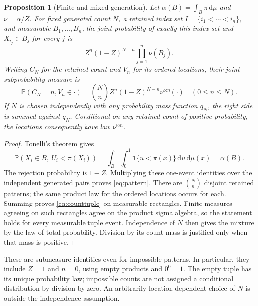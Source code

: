 \documentclass[11pt]{article}
\newtheorem{proposition}[theorem]{Proposition}
\theoremstyle{remark}
\newcommand{\Prb}{\mathbb P}
\newcommand{\dd}{\,\mathrm d}
\newcommand{\ind}{\mathbf 1}
\begin{document}
\begin{proposition}[Finite and mixed generation]\label{prop:finite-thinning}
Let $\alpha(B)=\int_B\pi\dd\mu$ and $\nu=\alpha/Z$. For fixed generated
count $N$, a retained index set $I=\{i_1<\cdots<i_n\}$, and measurable
$B_1,\ldots,B_n$, the joint probability of exactly this index set and
$X_{i_j}\in B_j$ for every $j$ is
\begin{equation}\label{eq:pattern}
 Z^n(1-Z)^{N-n}\prod_{j=1}^n\nu(B_j).
\end{equation}
Writing $C_N$ for the retained count and $V_n$ for its ordered locations,
their joint subprobability measure is
\begin{equation}\label{eq:counttuple}
 \Prb(C_N=n,V_n\in\cdot)
 =\binom Nn Z^n(1-Z)^{N-n}\nu^{\otimes n}(\cdot)
 \quad(0\le n\le N).
\end{equation}
If $N$ is chosen independently with any probability mass function $q_N$,
the right side is summed against $q_N$. Conditional on any retained count
of positive probability, the locations consequently have law
$\nu^{\otimes n}$.
\end{proposition}
\begin{proof}
Tonelli's theorem gives
\[
 \Prb(X_i\in B,\ U_i<\pi(X_i))
 =\int_B\int_0^1\ind\{u<\pi(x)\}\dd u\dd\mu(x)=\alpha(B).
\]
The rejection probability is $1-Z$. Multiplying these one-event
identities over the independent generated pairs proves
\eqref{eq:pattern}. There are $\binom Nn$ disjoint retained patterns;
the same product law for the ordered locations occurs for each. Summing
proves \eqref{eq:counttuple} on measurable rectangles. Finite measures
agreeing on such rectangles agree on the product sigma algebra, so the
statement holds for every measurable tuple event. Independence of $N$
then gives the mixture by the law of total probability. Division by its
count mass is justified only when that mass is positive.
\end{proof}

These are submeasure identities even for impossible patterns. In
particular, they include $Z=1$ and $n=0$, using empty products and $0^0=1$.
The empty tuple has its unique probability law; impossible counts are not
assigned a conditional distribution by division by zero. An arbitrarily
location-dependent choice of $N$ is outside the independence assumption.
\end{document}
